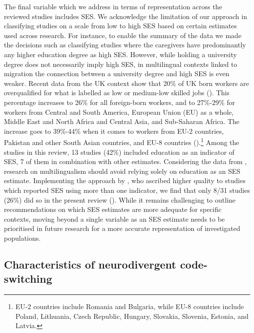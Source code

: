 \documentclass[output=paper]{langscibook}
\begin{document}
The final variable which we address in terms of representation across the reviewed studies includes SES. We acknowledge the limitation of our approach in classifying studies on a scale from low to high SES based on certain estimates used across research. For instance, to enable the summary of the data we made the decisions such as classifying studies where the caregivers have predominantly any higher education degree as high SES. However, while holding a university degree does not necessarily imply high SES, in multilingual contexts linked to migration the connection between a university degree and high SES is even weaker. Recent data from the UK context show that 20\% of UK born workers are overqualified for what is labelled as low or medium-low skilled jobs (\citealt{Fernandez-ReinoBrindle2024}). This percentage increases to 26\% for all foreign-born workers, and to 27\%-29\% for workers from Central and South America, European Union (EU) as a whole, Middle East and North Africa and Central Asia, and Sub-Saharan Africa. The increase goes to 39\%-44\% when it comes to workers from EU-2 countries, Pakistan and other South Asian countries, and EU-8 countries (\citealt{Fernandez-ReinoBrindle2024}).\footnote{EU-2 countries include Romania and Bulgaria, while EU-8 countries include Poland, Lithuania, Czech Republic, Hungary, Slovakia, Slovenia, Estonia, and Latvia.} Among the studies in this review, 13 studies (42\%) included education as an indicator of SES, 7 of them in combination with other estimates. Considering the data from \citet{Fernandez-ReinoBrindle2024}, research on multilingualism should avoid relying solely on education as an SES estimate. Implementing the approach by \citet{GirolamoEtAl2023studies}, who ascribed higher quality to studies which reported SES using more than one indicator, we find that only 8/31 studies (26\%) did so in the present review (\citealt{AnguloJimenez2020, CohenEtAl2025, GrossCastilla-Earls2023, Gutiérrez-ClellenEtAl2009, KapantzoglouEtAl2021, ShengEtAl2012, Yu2013}). While it remains challenging to outline recommendations on which SES estimates are more adequate for specific contexts, moving beyond a single variable as an SES estimate needs to be prioritised in future research for a more accurate representation of investigated populations.

\subsection{Characteristics of neurodivergent code-switching}
\end{document}
